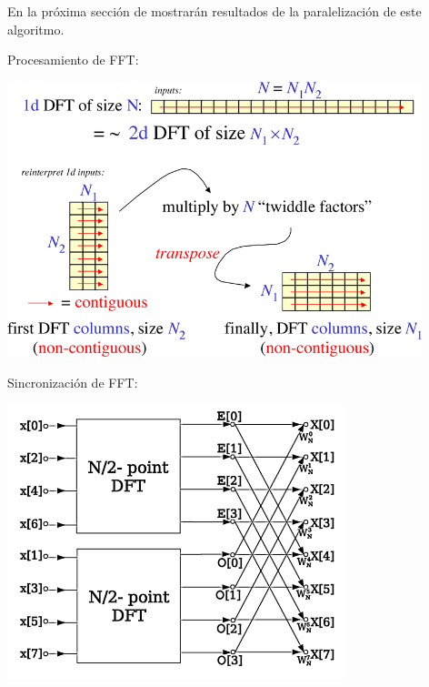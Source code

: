 En la próxima sección de mostrarán resultados de la paralelización de este algoritmo.

\vspace{1cm}
Procesamiento de FFT:
\begin{center}
    \includegraphics[height=8cm]{images/Cooley-tukey-general.png}
\end{center}

\vspace{1cm}
Sincronización de FFT:
\begin{center}
    \includegraphics[height=8cm]{images/DIT-FFT-butterfly.png}
\end{center}
